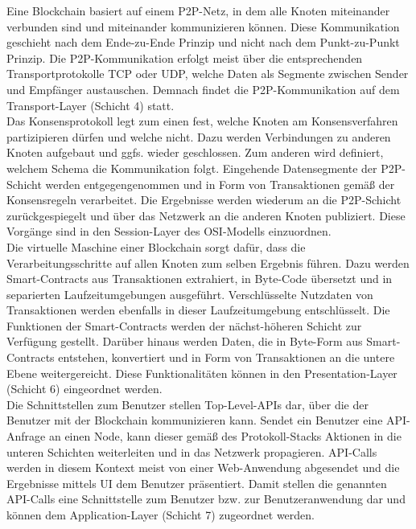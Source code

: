 Eine Blockchain basiert auf einem \ac{P2P}-Netz, in dem alle Knoten miteinander verbunden sind und miteinander kommunizieren können. Diese Kommunikation geschieht nach dem Ende-zu-Ende Prinzip und nicht nach dem Punkt-zu-Punkt Prinzip. Die \ac{P2P}-Kommunikation erfolgt meist über die entsprechenden Transportprotokolle TCP oder UDP, welche Daten als Segmente zwischen Sender und Empfänger austauschen. Demnach findet die \ac{P2P}-Kommunikation auf dem Transport-Layer (Schicht 4) statt.\\
Das Konsensprotokoll legt zum einen fest, welche Knoten am Konsensverfahren partizipieren dürfen und welche nicht. Dazu werden Verbindungen zu anderen Knoten aufgebaut und ggfs. wieder geschlossen. Zum anderen wird definiert, welchem Schema die Kommunikation folgt. Eingehende Datensegmente der \ac{P2P}-Schicht werden entgegengenommen und in Form von Transaktionen gemäß der Konsensregeln verarbeitet. Die Ergebnisse werden wiederum an die \ac{P2P}-Schicht zurückgespiegelt und über das Netzwerk an die anderen Knoten publiziert. Diese Vorgänge sind in den Session-Layer des \ac{OSI}-Modells einzuordnen.\\
Die virtuelle Maschine einer Blockchain sorgt dafür, dass die Verarbeitungsschritte auf allen Knoten zum selben Ergebnis führen. Dazu werden Smart-Contracts aus Transaktionen extrahiert, in Byte-Code übersetzt und in separierten Laufzeitumgebungen ausgeführt. Verschlüsselte Nutzdaten von Transaktionen werden ebenfalls in dieser Laufzeitumgebung entschlüsselt. Die Funktionen der Smart-Contracts werden der nächst-höheren Schicht zur Verfügung gestellt. Darüber hinaus werden Daten, die in Byte-Form aus Smart-Contracts entstehen, konvertiert und in Form von Transaktionen an die untere Ebene weitergereicht. Diese Funktionalitäten können in den Presentation-Layer (Schicht 6) eingeordnet werden.\\
Die Schnittstellen zum Benutzer stellen Top-Level-\ac{API}s dar, über die der Benutzer mit der Blockchain kommunizieren kann. Sendet ein Benutzer eine API-Anfrage an einen Node, kann dieser gemäß des Protokoll-Stacks Aktionen in die unteren Schichten weiterleiten und in das Netzwerk propagieren. API-Calls werden in diesem Kontext meist von einer Web-Anwendung abgesendet und die Ergebnisse mittels \ac{UI} dem Benutzer präsentiert. Damit stellen die genannten API-Calls eine Schnittstelle zum Benutzer bzw. zur Benutzeranwendung dar und können dem Application-Layer (Schicht 7) zugeordnet werden.\\

